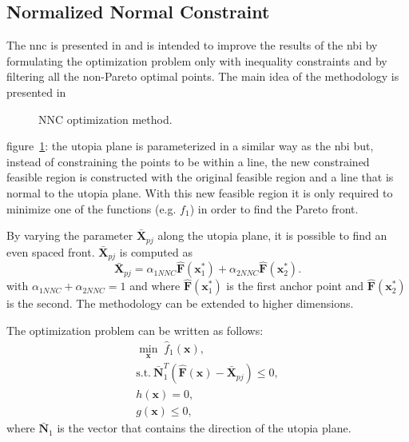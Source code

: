 \subsection{Normalized Normal Constraint}
\label{sec:NNC}
The \gls{nnc} is presented in \cite{Messac2003} and is intended to improve the results of the \gls{nbi} by formulating the optimization problem only with inequality constraints and by filtering all the non-Pareto optimal points. The main idea of the methodology is presented in
%
\begin{figure}%
	\centering
	\caption{NNC optimization method.}%
	\label{fig:NNC}%
\end{figure}
%
figure~\ref{fig:NNC}: the utopia plane is parameterized in a similar way as the \gls{nbi} but, instead of constraining the points to be within a line, the new constrained feasible region is constructed with the original feasible region and a line that is normal to the utopia plane. With this new feasible region it is only required to minimize one of the functions (e.g. $f_{1}$) in order to find the Pareto front.

By varying the parameter $\bar{\mathbf{X}}_{pj}$ along the utopia plane, it is possible to find an even spaced front. $\bar{\mathbf{X}}_{pj}$ is computed as%
%
\begin{equation}
\bar{\mathbf{X}}_{pj}= \alpha_{1NNC} \mathbf{\hat{F}}(\mathbf{x}_1^*)+\alpha_{2NNC} \mathbf{\hat{F}}(\mathbf{x}_2^*).
\label{eq:Xpj}
\end{equation}%
%
with $\alpha_{1NNC}+\alpha_{2NNC}=1$ and where $\mathbf{\hat{F}}(\mathbf{x}_1^*)$ is the first anchor point and $\mathbf{\hat{F}}(\mathbf{x}_2^*)$ is the second. The methodology can be extended to higher dimensions.

The optimization problem can be written as follows:
%
\begin{equation}
\begin{gathered}
\min_{\mathbf{x}}{\; \hat{f}_{1}(\mathbf{x})}, \\
\text{s.t.} \ \bar{\mathbf{N}}_1^T \left(\hat{\mathbf{F}}(\mathbf{x})-\bar{\mathbf{X}}_{pj}\right) \leq 0,\\
h(\mathbf{x})=0, \\
g(\mathbf{x}) \leq 0,
\end{gathered}
\label{eq:NNCProblem}
\end{equation}
%
where $\bar{\mathbf{N}}_1$ is the vector that contains the direction of the utopia plane.

